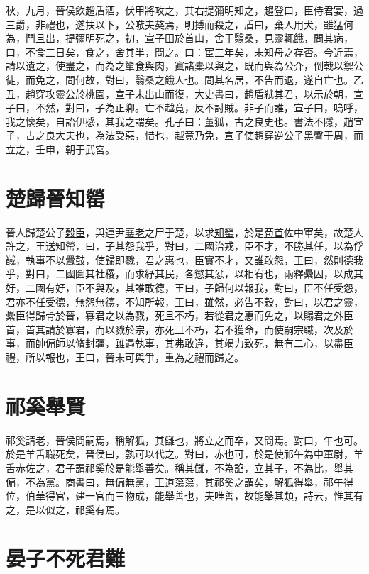 \documentclass{article}
\begin{document}
秋，九月，晉侯飲趙盾酒，伏甲將攻之，其右提彌明知之，趨登曰，臣侍君宴，過三爵，非禮也，遂扶以下，公嗾夫獒焉，明搏而殺之，盾曰，棄人用犬，雖猛何為，鬥且出，提彌明死之，初，宣子田於首山，舍于翳桑，見靈輒餓，問其病，曰，不食三日矣，食之，舍其半，問之。曰：宦三年矣，未知母之存否。今近焉，請以遺之，使盡之，而為之簞食與肉，寘諸橐以與之，既而與為公介，倒戟以禦公徒，而免之，問何故，對曰，翳桑之餓人也。問其名居，不告而退，遂自亡也。乙丑，趙穿攻靈公於桃園，宣子未出山而復，大史書曰，趙盾弒其君，以示於朝，宣子曰，不然，對曰，子為正卿。亡不越竟，反不討賊。非子而誰，宣子曰，嗚呼，我之懷矣，自詒伊慼，其我之謂矣。孔子曰：董狐，古之良史也。書法不隱，趙宣子，古之良大夫也，為法受惡，惜也，越竟乃免，宣子使趙穿逆公子黑臀于周，而立之，壬申，朝于武宮。

\section{楚歸晉知罃}

晉人歸楚公子\underline{穀臣}，與連尹\underline{襄老}之尸于楚，以求\underline{知罃}，於是\underline{荀首}佐中軍矣，故楚人許之，王送知罃，曰，子其怨我乎，對曰，二國治戎，臣不才，不勝其任，以為俘馘，執事不以釁鼓，使歸即戮，君之惠也，臣實不才，又誰敢怨，王曰，然則德我乎，對曰，二國圖其社稷，而求紓其民，各懲其忿，以相宥也，兩釋纍囚，以成其好，二國有好，臣不與及，其誰敢德，王曰，子歸何以報我，對曰，臣不任受怨，君亦不任受德，無怨無德，不知所報，王曰，雖然，必告不穀，對曰，以君之靈，纍臣得歸骨於晉，寡君之以為戮，死且不朽，若從君之惠而免之，以賜君之外臣首，首其請於寡君，而以戮於宗，亦死且不朽，若不獲命，而使嗣宗職，次及於事，而帥偏師以脩封疆，雖遇執事，其弗敢違，其竭力致死，無有二心，以盡臣禮，所以報也，王曰，晉未可與爭，重為之禮而歸之。

\section{祁奚舉賢}

	
祁奚請老，晉侯問嗣焉，稱解狐，其讎也，將立之而卒，又問焉。對曰，午也可。於是羊舌職死矣，晉侯曰，孰可以代之。對曰，赤也可，於是使祁午為中軍尉，羊舌赤佐之，君子謂祁奚於是能舉善矣。稱其讎，不為諂，立其子，不為比，舉其偏，不為黨。商書曰，無偏無黨，王道蕩蕩，其祁奚之謂矣，解狐得舉，祁午得位，伯華得官，建一官而三物成，能舉善也，夫唯善，故能舉其類，詩云，惟其有之，是以似之，祁奚有焉。

\section{晏子不死君難}
\end{document}
